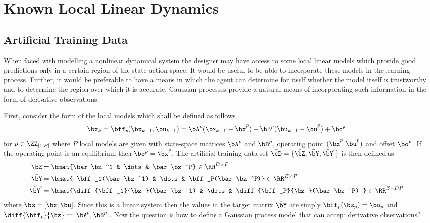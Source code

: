 \section{Known Local Linear Dynamics} %
\subsection{Artificial Training Data}
When faced with modelling a nonlinear dynamical system the designer may have access to some local linear models which provide good predictions only in a certain region of the state-action space. It would be useful to be able to incorporate these models in the learning process. Further, it would be preferable to have a means in which the agent can determine for itself whether the model itself is trustworthy and to determine the region over which it is accurate. Gaussian processes provide a natural means of incorporating such information in the form of derivative observations.

First, consider the form of the local models which shall be defined as follows
\begin{equation}
\bx_{k} = \bff_p(\bx_{k-1},\bu_{k-1}) =  \bA^p(\bx_{k-1} - \bar\bx^p) + \bB^p(\bu_{k-1} - \bar\bu^p) + \bo^p
\end{equation}
for $p \in \ZZ_{[1,P]}$ where $P$ local models are given with state-space matrices $\bA^p$ and $\bB^p$, operating point $(\bar\bx^p,\bar\bu^p)$ and offset $\bo^p$. If the operating point is an equilibrium then $\bo^p = \bar\bx^p$. The artificial training data set $\bar\cD = \{\bar\bZ,\bar\bY,\bar\bY'\}$ is then defined as
\begin{align}
\bar\bZ &= \bmat{\bar\bz^1 & \dots & \bar\bz^P} \in \RR^{D\times P}   \\
\bar\bY &= \bmat{ \bff_1(\bar\bz^1) & \dots & \bff_P(\bar\bz^P)} \in \RR^{E\times P} \\
\bar\bY' &= \bmat{\diff{\bff_1}{\bz}(\bar\bz^1) & \dots & \diff{\bff_P}{\bz}(\bar\bz^P)  } \in \RR^{E\times DP}
\end{align}
where $\bar\bz = [\bar\bx; \bar\bu]$. Since this is a linear system then the values in the target matrix $\bar\bY$ are simply $\bff_p(\bar\bz_p) = \bo_p$ and $\diff{\bff_p}{\bz} = [\bA^p, \bB^p]$. Now the question is how to define a Gaussian process model that can accept derivative observations?



